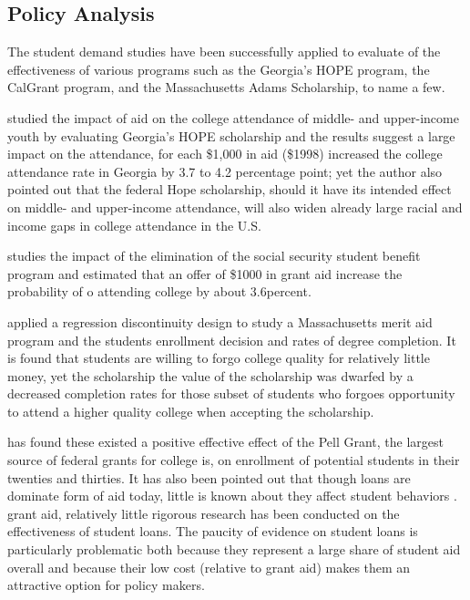 \documentclass[12pt,english]{report}
\begin{document}
\subsection{Policy Analysis }
The student demand studies have been successfully applied to evaluate of the
effectiveness of various programs such as the Georgia's HOPE program, the
CalGrant program,  and the Massachusetts Adams Scholarship, to name a few.

\citet{Dynarski2000} studied the impact of aid on the college attendance of
middle- and upper-income youth by evaluating Georgia's HOPE scholarship and the
results suggest a large impact on the attendance, for each \$1,000 in aid
(\$1998) increased the college attendance rate in Georgia by 3.7  to 4.2
percentage point; yet the author also pointed out that the federal Hope
scholarship, should it have its intended effect on middle- and upper-income
attendance, will also widen already large racial and income gaps in college
attendance in the U.S.

\citet{Dynarski2003} studies the impact of the elimination of the social
security student benefit program and estimated that an offer of \$1000 in grant
aid increase the probability of o attending college by about 3.6percent.

\citet{Cohodes2014} applied a regression discontinuity design to study a
Massachusetts merit aid program and the students enrollment decision and rates
of degree completion.  It is found that students are willing to forgo college
quality for relatively little money, yet the scholarship the value of the
scholarship was dwarfed by a decreased completion rates for those subset of
students who  forgoes opportunity to attend a higher quality college when
accepting the scholarship.

\citet{Turner2002} has found these existed a positive effective effect of the
Pell Grant, the largest source of federal grants for college is, on enrollment
of potential students in their twenties and thirties.  It has also been pointed
out that though loans are dominate form of aid today, little is known about
they affect student behaviors \citep{Dynarski2013}.    %
grant aid, relatively little rigorous research has been conducted on the
effectiveness of student loans. The paucity of evidence on student loans is
particularly problematic both because they represent a large share of student
aid overall and because their low cost (relative to grant aid) makes them an
attractive option for policy makers.
\end{document}
